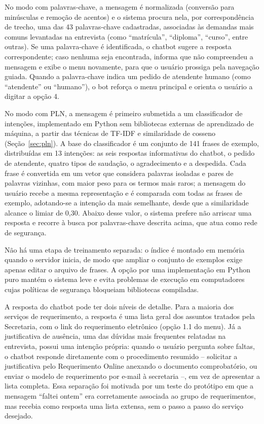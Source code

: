 \documentclass[12pt]{article}
\begin{document}
No modo com palavras-chave, a mensagem é normalizada (conversão para
minúsculas e remoção de acentos) e o sistema procura nela, por
correspondência de trecho, uma das 43 palavras-chave cadastradas,
associadas às demandas mais comuns levantadas na entrevista (como
``matrícula'', ``diploma'', ``curso'', entre outras). Se uma palavra-chave é
identificada, o chatbot sugere a resposta correspondente; caso nenhuma
seja encontrada, informa que não compreendeu a mensagem e exibe o menu
novamente, para que o usuário prossiga pela navegação guiada. Quando a
palavra-chave indica um pedido de atendente humano (como ``atendente'' ou
``humano''), o bot reforça o menu principal e orienta o usuário a digitar a
opção 4.

No modo com PLN, a mensagem é primeiro submetida a um classificador de
intenções, implementado em Python sem bibliotecas externas de aprendizado
de máquina, a partir das técnicas de TF-IDF e similaridade de cosseno
(Seção~\ref{sec:pln}). A base do classificador é um conjunto de 141 frases
de exemplo, distribuídas em 13 intenções: as seis respostas informativas
do chatbot, o pedido de atendente, quatro tipos de saudação, o
agradecimento e a despedida. Cada frase é convertida em um vetor que
considera palavras isoladas e pares de palavras vizinhas, com maior peso
para os termos mais raros; a mensagem do usuário recebe a mesma
representação e é comparada com todas as frases de exemplo, adotando-se a
intenção da mais semelhante, desde que a similaridade alcance o limiar de
0,30. Abaixo desse valor, o sistema prefere não arriscar uma resposta e
recorre à busca por palavras-chave descrita acima, que atua como rede de
segurança.

Não há uma etapa de treinamento separada: o índice é montado em memória
quando o servidor inicia, de modo que ampliar o conjunto de exemplos exige
apenas editar o arquivo de frases. A opção por uma implementação em Python
puro mantém o sistema leve e evita problemas de execução em computadores
cujas políticas de segurança bloqueiam bibliotecas compiladas.

A resposta do chatbot pode ter dois níveis de detalhe. Para a maioria dos
serviços de requerimento, a resposta é uma lista geral dos assuntos
tratados pela Secretaria, com o link do requerimento eletrônico (opção 1.1
do menu). Já a justificativa de ausência, uma das dúvidas mais frequentes
relatadas na entrevista, possui uma intenção própria: quando o usuário
pergunta sobre faltas, o chatbot responde diretamente com o procedimento
resumido -- solicitar a justificativa pelo Requerimento Online anexando o
documento comprobatório, ou enviar o modelo de requerimento por e-mail à
secretaria --, em vez de apresentar a lista completa. Essa separação foi
motivada por um teste do protótipo em que a mensagem ``faltei ontem'' era
corretamente associada ao grupo de requerimentos, mas recebia como
resposta uma lista extensa, sem o passo a passo do serviço desejado.
\end{document}

